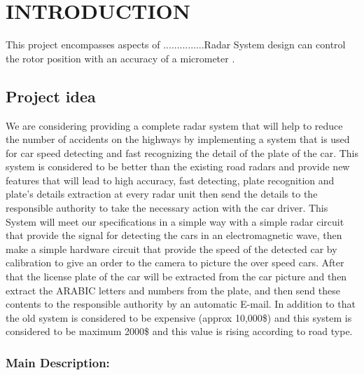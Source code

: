 
\chapter{INTRODUCTION}
\label{chapter:Intro}

\ifpdf
    \graphicspath{{1_Introduction/figures/PNG/}{1_Introduction/figures/PDF/}{1_Introduction/figures/}}
\else
    \graphicspath{{1_Introduction/figures/EPS/}{1_Introduction/figures/}}
\fi

% 


This project encompasses aspects of ...............Radar System design can control the rotor position with an accuracy of a micrometer \cite{Cleanroom}. 
\section{Project idea}
\noindent We are considering providing a complete radar system that
will help to reduce the number of accidents on the
highways by implementing a system that is used for car
speed detecting and fast recognizing the detail of the plate
of the car. This system is considered to be better than the
existing road radars and provide new features that will lead
to high accuracy, fast detecting, plate recognition and
plate's details extraction at every radar unit then send the
details to the responsible authority to take the necessary
action with the car driver. This System will meet our
specifications in a simple way with a simple radar circuit
that provide the signal for detecting the cars in an
electromagnetic wave, then make a simple hardware circuit
that provide the speed of the detected car by calibration to
give an order to the camera to picture the over speed cars.
After that the license plate of the car will be extracted from
the car picture and then extract the ARABIC letters and
numbers from the plate, and then send these contents to the
responsible authority by an automatic E-mail. In addition to
that the old system is considered to be expensive (approx
10,000\$) and this system is considered to be maximum
2000\$ and this value is rising according to road type.
\subsection{Main Description:}

